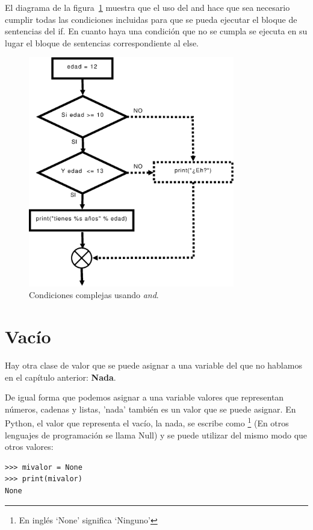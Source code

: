 El diagrama de la figura~\ref{if9} muestra que el uso del and hace que sea necesario cumplir todas las condiciones incluidas para que se pueda ejecutar el bloque de sentencias del if. En cuanto haya una condición que no se cumpla se ejecuta en su lugar el bloque de sentencias correspondiente al else.

\begin{figure}
\begin{center}
\includegraphics[width=90mm]{if9.eps}
\end{center}
\caption{Condiciones complejas usando \emph{and}.}\label{if9}
\end{figure}

\section{Vacío}

Hay otra clase de valor que se puede asignar a una variable del que no hablamos en el capítulo anterior:  \textbf{Nada}.
\par
De igual forma que podemos asignar a una variable valores que representan números, cadenas y listas, 'nada' también es un valor que se puede asignar.  En Python, el valor que representa el vacío, la nada, se escribe como \footnote{En inglés `None' significa `Ninguno'} (En otros lenguajes de programación se llama Null) y se puede utilizar del mismo modo que otros valores:

\begin{listing}
\begin{verbatim}
>>> mivalor = None
>>> print(mivalor)
None
\end{verbatim}
\end{listing}

